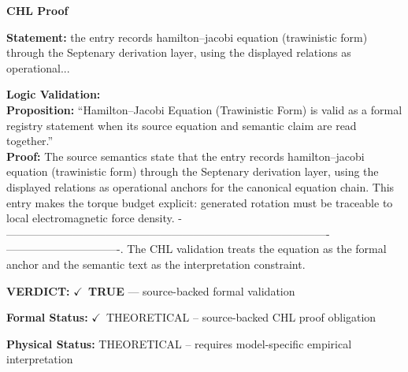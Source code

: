 \vspace{0.45em}
\noindent\textbf{CHL Proof}\par
\textbf{Statement:} the entry records hamilton--jacobi equation (trawinistic form) through the Septenary
derivation layer, using the displayed relations as operational...

\textbf{Logic Validation:}\\
\textbf{Proposition:} ``Hamilton--Jacobi Equation (Trawinistic Form) is valid as a formal registry statement
when its source equation and semantic claim are read together.''\\
\textbf{Proof:} The source semantics state that the entry records hamilton--jacobi equation (trawinistic
form) through the Septenary derivation layer, using the displayed relations as
operational anchors for the canonical equation chain. This entry makes the torque budget
explicit: generated rotation must be traceable to local electromagnetic force density. -
----------------------------------------------------------------------------------------
-------------------------------. The CHL validation treats the equation as the formal
anchor and the semantic text as the interpretation constraint.

\textbf{VERDICT:} \ensuremath{\checkmark}\ \textbf{TRUE} --- source-backed formal validation

\textbf{Formal Status:} \ensuremath{\checkmark}\ THEORETICAL -- source-backed CHL proof obligation

\textbf{Physical Status:} THEORETICAL -- requires model-specific empirical interpretation
\par\vspace{0.45em}
\par
\ifTZPDarkEdition
{}
\fi
\endgroup
\endgroup
